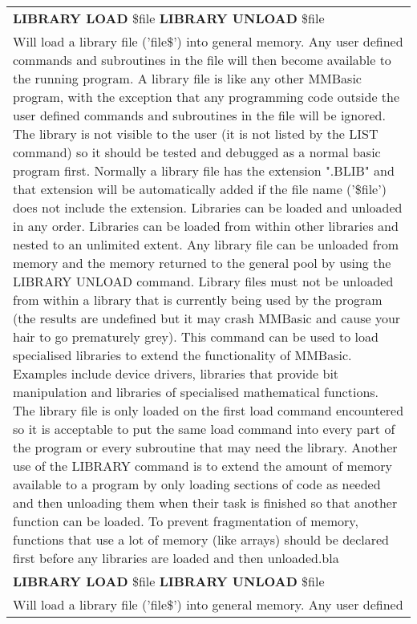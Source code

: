 \documentclass[11pt,fleqn]{book} %
\numberwithin{equation}{section} %
\numberwithin{figure}{section} %
\numberwithin{table}{section} %
\begin{document}
\begin{center}
\begin{longtable}{l}
\textbf{LIBRARY LOAD} \$file\newline
\textbf{LIBRARY UNLOAD} \$file
\\ Will load a library file ('file\$') into general memory. Any user defined
commands and subroutines in the file will then become available to the
running program.\newline 
A library file is like any other MMBasic program, with the exception
that any programming code outside the user defined commands and
subroutines in the file will be ignored. The library is not visible to the
user (it is not listed by the LIST command) so it should be tested and
debugged as a normal basic program first. Normally a library file has
the extension ".BLIB" and that extension will be automatically added if
the file name ('\$file') does not include the extension.\newline
Libraries can be loaded and unloaded in any order. Libraries can be
loaded from within other libraries and nested to an unlimited extent.
Any library file can be unloaded from memory and the memory returned
to the general pool by using the LIBRARY UNLOAD command.\newline
Library files must not be unloaded from within a library that is currently
being used by the program (the results are undefined but it may crash
MMBasic and cause your hair to go prematurely grey).\newline
This command can be used to load specialised libraries to extend the
functionality of MMBasic. Examples include device drivers, libraries
that provide bit manipulation and libraries of specialised mathematical
functions. The library file is only loaded on the first load command
encountered so it is acceptable to put the same load command into every
part of the program or every subroutine that may need the library.\newline
Another use of the LIBRARY command is to extend the amount of
memory available to a program by only loading sections of code as
needed and then unloading them when their task is finished so that
another function can be loaded.\newline
To prevent fragmentation of memory, functions that use a lot of memory
(like arrays) should be declared first before any
libraries are loaded and then unloaded.bla
\\ \hline
\textbf{LIBRARY LOAD} \$file\newline
\textbf{LIBRARY UNLOAD} \$file
\\ Will load a library file ('file\$') into general memory. Any user defined

\end{longtable}
\end{center}
\end{document}

